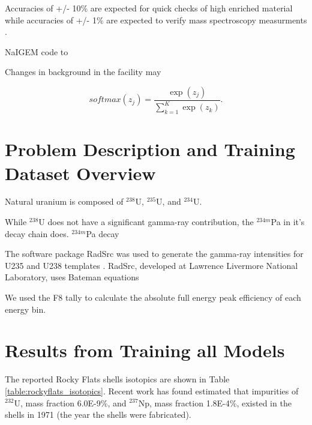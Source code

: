 Accuracies of +/- 10\% are expected for quick checks of high enriched material while accuracies of +/- 1\% are expected to verify mass spectroscopy measurments \cite{Kull1974}.


NaIGEM code to \cite{MORTREAU2004} 


Changes in background in the facility may 




\begin{equation} \label{eq:uenrichment}
softmax(z_j) = \frac{\exp(z_j)} {\sum_{k=1}^{K} \exp(z_k)}.
\end{equation}




\section{Problem Description and Training Dataset Overview}

Natural uranium is composed of $^{238}$U, $^{235}$U, and $^{234}$U. 

While $^{238}$U does not have a significant gamma-ray contribution, the $^{234m}$Pa in it's decay chain does. $^{234m}$Pa decay


The software package RadSrc was used to generate the gamma-ray intensities for U235 and U238 templates \cite{Hiller2007}. RadSrc, developed at Lawrence Livermore National Laboratory, uses Bateman equations 

We used the F8 tally to calculate the absolute full energy peak efficiency of each energy bin.



\section{Results from Training all Models}


The reported Rocky Flats shells isotopics are shown in Table \ref{table:rockyflats_isotopics}. Recent work has found estimated that impurities of $^{232}$U, mass fraction 6.0E-9\%, and $^{237}$Np, mass fraction 1.8E-4\%, \cite{RawoolSullivan2012} existed in the shells in 1971 (the year the shells were fabricated).

